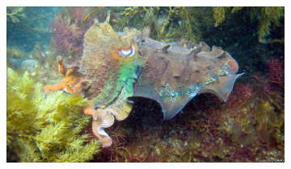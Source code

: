 \documentclass[a4paper,12pt]{ctexart}
\begin{document}
\begin{figure}[h!]
    \centering
    \begin{subfigure}{0.5\textwidth}
        \centering
        \includegraphics[width=\linewidth]{figures/CAMO_demo1/CAMO_demo1_ori.png}
        \label{fig:demo1_ori}
    \end{subfigure} \\


\end{figure}
\end{document}
